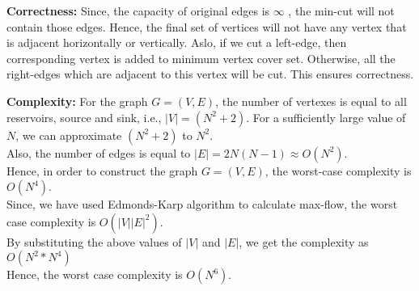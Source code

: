 \documentclass[12pt]{article}
\begin{document}
\begin{enumerate}
\textbf{Correctness:} Since, the capacity of original edges is $\infty$ , the min-cut will not contain those edges. Hence, the final set of vertices will not have any vertex that is adjacent horizontally or vertically. Aslo, if we cut a left-edge, then corresponding vertex is added to minimum vertex cover set. Otherwise, all the right-edges which are adjacent to this vertex will be cut. This ensures correctness. 

\textbf{Complexity:} For the graph $G=(V,E)$, the number of vertexes is equal to all reservoirs, source and sink, i.e., $|V| = (N^2 + 2)$. For a sufficiently large value of $N$, we can approximate $(N^2+2)$ to $N^2$.\\
Also, the number of edges is equal to $|E| = 2N(N-1) \approx O(N^2)$.\\ 
Hence, in order to construct the graph $G=(V,E)$, the worst-case complexity is $O(N^4)$.\\
Since, we have used Edmonds-Karp algorithm to calculate max-flow, the worst case complexity is $O(|V||E|^2)$. \\
By substituting the above values of $|V|$ and $|E|$, we get the complexity as $O(N^2*N^4)$\\
Hence, the worst case complexity is $O(N^6)$.
\pagebreak

\end{enumerate}
\pagebreak
\end{document}
